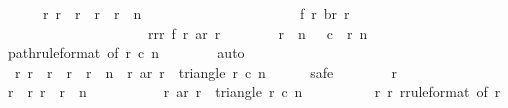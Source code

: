 \begin{isabellebody}
\ \ \ \ \ \ {\isachardoublequoteopen}{\isasymforall}r{\isachardot}\ r{}\ {\isasymle}\ r\ {\isasymand}\ r\ {\isacharless}\ r{}\ {\isacharplus}\ n\ {\isasymlongrightarrow}\isanewline
\ \ \ \ \ \ \ \ \ \ \ \ \ \ \ \ \ \ \ \ \ f\ r\ {\isacharparenleft}br\ r{\isacharparenright}\ {\isacharequal}\isanewline
\ \ \ \ \ \ \ \ \ \ \ \ \ \ \ \ \ \ \ \ \ {\isacharparenleft}{\isasymSum}r{\isacharprime}{\isasymleftarrow}{\isacharbrackleft}r{}{\isachardot}{\isachardot}{\isacharless}r{\isacharplus}{}{\isacharbrackright}{\isachardot}\ f\ r{\isacharprime}\ {\isacharparenleft}ar\ r{\isacharprime}{\isacharparenright}{\isacharparenright}{\isachardoublequoteclose}\isanewline
\ \ \ \ \ \ \isamarkupfalse%
\ {\isacharbackquoteopen}r{}\ {\isacharplus}\ n\ {\isasymle}\ {}{}{}{}{\isacharbackquoteclose}\ {\isacharbackquoteopen}c{}\ {\isasymle}\ r{}{\isacharbackquoteclose}\ {\isacharbackquoteopen}n\ {\isasymge}\ {}{}{}{}{\isacharbackquoteclose}\isanewline
\ \ \ \ \ \ \isamarkupfalse%
\ path{\isacharbrackleft}rule{\isacharunderscore}format{\isacharcomma}\ of\ r{}\ c{}\ n{\isacharbrackright}\isanewline
\ \ \ \ \ \ \isamarkupfalse%
\ auto\isanewline
\isanewline
\ \ \ \ \isamarkupfalse%
\ {\isachardoublequoteopen}{\isasymforall}\ r{\isachardot}\ r{}\ {\isasymle}\ r\ {\isasymand}\ r\ {\isacharless}\ r{}\ {\isacharplus}\ n\ {\isasymlongrightarrow}\ {\isacharparenleft}r{\isacharcomma}\ ar\ r{\isacharparenright}\ {\isasymin}\ triangle\ r{}\ c{}\ n{\isachardoublequoteclose}\isanewline
\ \ \ \ \isamarkupfalse%
\ safe\isanewline
\ \ \ \ \ \ \isamarkupfalse%
\ r\isanewline
\ \ \ \ \ \ \isamarkupfalse%
\ {\isachardoublequoteopen}r{}\ {\isasymle}\ r{\isachardoublequoteclose}\ {\isachardoublequoteopen}r\ {\isacharless}\ r{}\ {\isacharplus}\ n{\isachardoublequoteclose}\ \isanewline
\ \ \ \ \ \ \isamarkupfalse%
\ \isamarkupfalse%
\ {\isachardoublequoteopen}{\isacharparenleft}r{\isacharcomma}\ ar\ r{\isacharparenright}\ {\isasymin}\ triangle\ r{}\ c{}\ n{\isachardoublequoteclose}\isanewline
\ \ \ \ \ \ \ \ \isamarkupfalse%
\ r{\isacharparenleft}{}{\isacharparenright}\ r{\isacharparenleft}{}{\isacharparenright}\ r{\isacharparenleft}{}{\isacharparenright}{\isacharbrackleft}rule{\isacharunderscore}format{\isacharcomma}\ of\ r{\isacharbrackright}\isanewline

\end{isabellebody}
